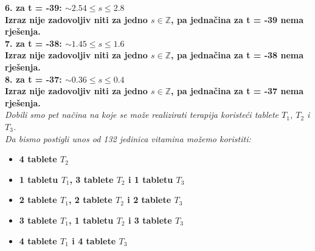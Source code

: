 \documentclass[12pt]{article}
\begin{document}
\begin{enumerate}
\begin{center}
         \textbf{6. za t = -39: $\sim2.54 \leq s \leq 2.8$\\Izraz nije zadovoljiv niti za jedno $s\in\mathbb{Z}$, pa jednačina za t = -39 nema rješenja.}\\
           \textbf{7. za t = -38: $\sim1.45 \leq s \leq 1.6$\\Izraz nije zadovoljiv niti za jedno $s\in\mathbb{Z}$, pa jednačina za t = -38 nema rješenja.}\\
         \textbf{8. za t = -37: $\sim0.36 \leq s \leq 0.4$\\Izraz nije zadovoljiv niti za jedno $s\in\mathbb{Z}$, pa jednačina za t = -37 nema rješenja.}\\
          \vspace*{0.75cm}
         \textit{Dobili smo pet načina na koje se može realizirati terapija koristeći tablete $T_1$, $T_2$ i $T_3$.\\Da bismo postigli unos od 132 jedinica vitamina možemo koristiti:\\}
         \begin{itemize}
         \item \textbf{4 tablete $T_2$\\}
           \item \textbf{1 tabletu $T_1$, 3 tablete $T_2$ i 1 tabletu $T_3$\\}
            \item \textbf{2 tablete $T_1$, 2 tablete $T_2$ i 2 tablete $T_3$\\}
            \item \textbf{3 tablete $T_1$, 1 tabletu $T_2$ i 3 tablete $T_3$\\}
             \item \textbf{4 tablete $T_1$ i 4 tablete $T_3$\\}
             \end{itemize}
	    \end{center}
	    

\end{enumerate}
\end{document}

